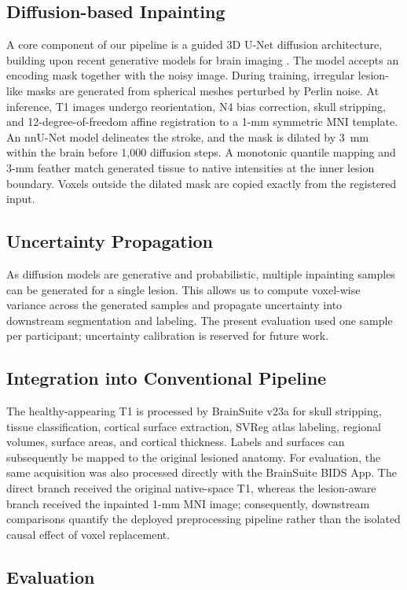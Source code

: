 \documentclass[runningheads]{llncs}
\begin{document}
\subsection{Diffusion-based Inpainting}
A core component of our pipeline is a guided 3D U-Net diffusion architecture, building upon recent generative models for brain imaging \cite{Pinaya2022}. The model accepts an encoding mask together with the noisy image. During training, irregular lesion-like masks are generated from spherical meshes perturbed by Perlin noise. At inference, T1 images undergo reorientation, N4 bias correction, skull stripping, and 12-degree-of-freedom affine registration to a 1-mm symmetric MNI template. An nnU-Net model delineates the stroke, and the mask is dilated by 3~mm within the brain before 1,000 diffusion steps. A monotonic quantile mapping and 3-mm feather match generated tissue to native intensities at the inner lesion boundary. Voxels outside the dilated mask are copied exactly from the registered input.


\subsection{Uncertainty Propagation}
As diffusion models are generative and probabilistic, multiple inpainting samples can be generated for a single lesion. This allows us to compute voxel-wise variance across the generated samples and propagate uncertainty into downstream segmentation and labeling. The present evaluation used one sample per participant; uncertainty calibration is reserved for future work.

\subsection{Integration into Conventional Pipeline}
The healthy-appearing T1 is processed by BrainSuite v23a \cite{Shattuck2002} for skull stripping, tissue classification, cortical surface extraction, SVReg atlas labeling, regional volumes, surface areas, and cortical thickness. Labels and surfaces can subsequently be mapped to the original lesioned anatomy. For evaluation, the same acquisition was also processed directly with the BrainSuite BIDS App. The direct branch received the original native-space T1, whereas the lesion-aware branch received the inpainted 1-mm MNI image; consequently, downstream comparisons quantify the deployed preprocessing pipeline rather than the isolated causal effect of voxel replacement.

\subsection{Evaluation}
\end{document}
